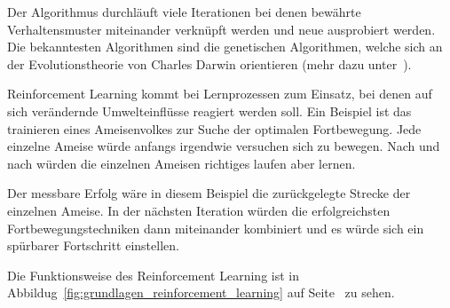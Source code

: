 Der Algorithmus durchläuft viele Iterationen bei denen bewährte Verhaltensmuster miteinander verknüpft werden und neue
ausprobiert werden. Die bekanntesten Algorithmen sind die genetischen Algorithmen, welche sich an der Evolutionstheorie
von Charles Darwin orientieren (mehr dazu unter~\cite{book_grundlagen_learnings}).

Reinforcement Learning kommt bei Lernprozessen zum Einsatz, bei denen auf sich verändernde Umwelteinflüsse reagiert
werden soll. Ein Beispiel ist das trainieren eines Ameisenvolkes zur Suche der optimalen Fortbewegung. Jede einzelne
Ameise würde anfangs irgendwie versuchen sich zu bewegen. Nach und nach würden die einzelnen Ameisen richtiges laufen
aber lernen.

Der messbare Erfolg wäre in diesem Beispiel die zurückgelegte Strecke der einzelnen Ameise. In der nächsten Iteration
würden die erfolgreichsten Fortbewegungstechniken dann miteinander kombiniert und es würde sich ein spürbarer
Fortschritt einstellen.

Die Funktionsweise des Reinforcement Learning ist in Abbildug~\ref{fig:grundlagen_reinforcement_learning} auf
Seite~\pageref{fig:grundlagen_reinforcement_learning} zu sehen.


